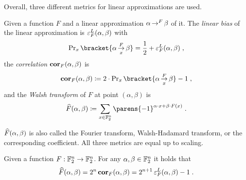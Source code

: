 Overall, three different metrics for linear approximations are used.
\begin{definition}\label{def:bias-cor-walsh}
    Given a function $F$ and a linear approximation $\alpha \operatorname*{\rightarrow}^{F}_{} \beta$ of it.
    The \emph{linear bias} of the linear approximation is $\operatorname{\varepsilon}^L_{F}(\alpha, \beta)$ with
    \begin{equation*}
        \Prob_x\bracket{\propLin{\alpha}{F}{x}{\beta}} = \frac{1}{2} + \bias^L_{F}(\alpha, \beta)\;,
    \end{equation*}
    the \emph{correlation} $\operatorname{\mathbf{cor}}_{F}(\alpha, \beta)$ is
    \begin{equation*}
        \cor_{F}(\alpha, \beta) \coloneqq 2 \cdot \Prob_x\bracket{\propLin{\alpha}{F}{x}{\beta}} - 1\;,
    \end{equation*}
    and the \emph{Walsh transform} of $F$ at point $(\alpha, \beta)$ is
    \begin{equation*}
        \FC{F}(\alpha, \beta) \coloneqq \sum_{x \in \F_2^n} \parens{-1}^{\iprod{\alpha}{x} + \iprod{\beta}{F(x)}}\;.
    \end{equation*}
\end{definition}
$\widehat{F}(\alpha, \beta)$ is also called the Fourier transform, Walsh-Hadamard transform, or the corresponding coefficient.
All three metrics are equal up to scaling.
\begin{lemma}
    Given a function $F : \mathbb{F}_2^n \to \mathbb{F}_2^n$.
    For any $\alpha, \beta \in \mathbb{F}_2^n$ it holds that
    \begin{equation*}
        \widehat{F}(\alpha, \beta) = 2^n \operatorname{\mathbf{cor}}_{F}(\alpha, \beta) = 2^{n+1} \operatorname{\varepsilon}^L_{F}(\alpha, \beta) - 1\;.
    \end{equation*}
\end{lemma}
